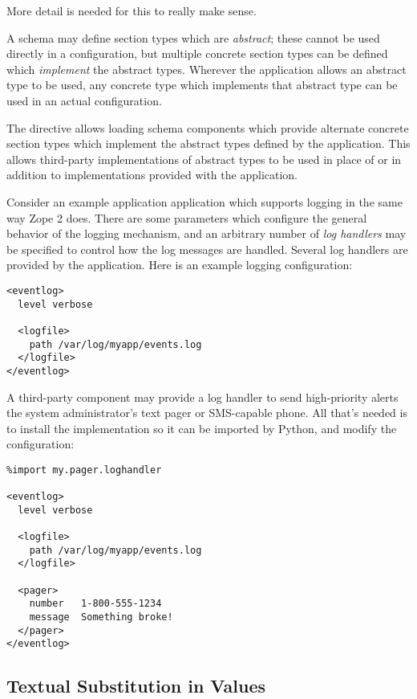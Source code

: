 \documentclass{howto}
\begin{document}
More detail is needed for this to really make sense.

A schema may define section types which are \emph{abstract}; these
cannot be used directly in a configuration, but multiple concrete
section types can be defined which \emph{implement} the abstract
types.  Wherever the application allows an abstract type to be used,
any concrete type which implements that abstract type can be used in
an actual configuration.

The  directive allows loading schema components
which provide alternate concrete section types which implement the
abstract types defined by the application.  This allows third-party
implementations of abstract types to be used in place of or in
addition to implementations provided with the application.

Consider an example application application which supports logging in
the same way Zope 2 does.  There are some parameters which configure
the general behavior of the logging mechanism, and an arbitrary number
of \emph{log handlers} may be specified to control how the log
messages are handled.  Several log handlers are provided by the
application.  Here is an example logging configuration:

\begin{verbatim}
<eventlog>
  level verbose

  <logfile>
    path /var/log/myapp/events.log
  </logfile>
</eventlog>
\end{verbatim}

A third-party component may provide a log handler to send
high-priority alerts the system administrator's text pager or
SMS-capable phone.  All that's needed is to install the implementation
so it can be imported by Python, and modify the configuration:

\begin{verbatim}
%import my.pager.loghandler

<eventlog>
  level verbose

  <logfile>
    path /var/log/myapp/events.log
  </logfile>

  <pager>
    number   1-800-555-1234
    message  Something broke!
  </pager>
</eventlog>
\end{verbatim}


\subsection{Textual Substitution in Values}
\end{document}
